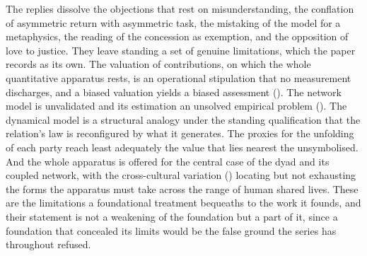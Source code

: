 The replies dissolve the objections that rest on misunderstanding, the conflation of asymmetric return with asymmetric task, the mistaking of the model for a metaphysics, the reading of the concession as exemption, and the opposition of love to justice. They leave standing a set of genuine limitations, which the paper records as its own. The valuation of contributions, on which the whole quantitative apparatus rests, is an operational stipulation that no measurement discharges, and a biased valuation yields a biased assessment (). The network model is unvalidated and its estimation an unsolved empirical problem (). The dynamical model is a structural analogy under the standing qualification that the relation's law is reconfigured by what it generates. The proxies for the unfolding of each party reach least adequately the value that lies nearest the unsymbolised. And the whole apparatus is offered for the central case of the dyad and its coupled network, with the cross-cultural variation () locating but not exhausting the forms the apparatus must take across the range of human shared lives. These are the limitations a foundational treatment bequeaths to the work it founds, and their statement is not a weakening of the foundation but a part of it, since a foundation that concealed its limits would be the false ground the series has throughout refused.
